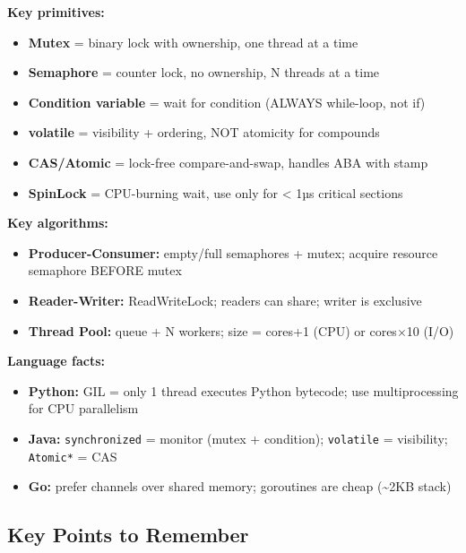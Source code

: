 \documentclass[11pt]{article}
\providecommand{\tightlist}{\setlength{\itemsep}{1pt}\setlength{\parskip}{0pt}}
\begin{document}
\textbf{Key primitives:}

\begin{itemize}
\tightlist
\item
  \textbf{Mutex} = binary lock with ownership, one thread at a time
\item
  \textbf{Semaphore} = counter lock, no ownership, N threads at a time
\item
  \textbf{Condition variable} = wait for condition (ALWAYS while-loop, not if)
\item
  \textbf{volatile} = visibility + ordering, NOT atomicity for compounds
\item
  \textbf{CAS/Atomic} = lock-free compare-and-swap, handles ABA with stamp
\item
  \textbf{SpinLock} = CPU-burning wait, use only for \textless{} 1µs critical sections
\end{itemize}

\textbf{Key algorithms:}

\begin{itemize}
\tightlist
\item
  \textbf{Producer-Consumer:} empty/full semaphores + mutex; acquire resource semaphore BEFORE mutex
\item
  \textbf{Reader-Writer:} ReadWriteLock; readers can share; writer is exclusive
\item
  \textbf{Thread Pool:} queue + N workers; size = cores+1 (CPU) or cores\(\times\)10 (I/O)
\end{itemize}

\textbf{Language facts:}

\begin{itemize}
\tightlist
\item
  \textbf{Python:} GIL = only 1 thread executes Python bytecode; use multiprocessing for CPU parallelism
\item
  \textbf{Java:} \texttt{synchronized} = monitor (mutex + condition); \texttt{volatile} = visibility; \texttt{Atomic*} = CAS
\item
  \textbf{Go:} prefer channels over shared memory; goroutines are cheap (\textasciitilde2KB stack)
\end{itemize}

\subsection{Key Points to Remember}\label{key-points-to-remember}
\end{document}
